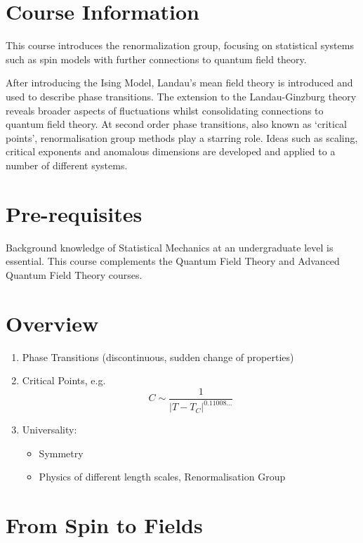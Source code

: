 \documentclass[a4paper,11pt]{article}
\begin{document}
	\maketitlepage
	\preliminaries

	\section*{Course Information}
	
	This course introduces the renormalization group, focusing on statistical systems such as spin models with further connections to quantum field theory.

	\noindent After introducing the Ising Model, Landau’s mean field theory is introduced and used to describe phase transitions. The extension to the Landau-Ginzburg theory reveals broader aspects of fluctuations whilst consolidating connections to quantum field theory. At second order phase transitions, also known as ‘critical points’, renormalisation group methods play a starring role. Ideas such as scaling, critical exponents and anomalous dimensions are developed and applied to a number of different systems.

	\section*{Pre-requisites}

	Background knowledge of Statistical Mechanics at an undergraduate level is essential. This course complements the Quantum Field Theory and Advanced Quantum Field Theory courses.

	\newpage

	\section*{Overview}
	\begin{enumerate}
		\item Phase Transitions (discontinuous, sudden change of properties)
		\item Critical Points, e.g.\ \[
			C \sim \frac{1}{|T - T_C|^{0.11008\dots}}
		\]
		\item Universality:
		\begin{itemize}
			\item Symmetry
			\item Physics of different length scales, Renormalisation Group
		\end{itemize}
	\end{enumerate}


  
	\newpage
	\tableofcontents
	\newpage
	\maintext
	\section{From Spin to Fields}
\end{document}
